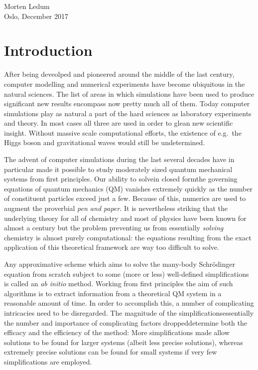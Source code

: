 \documentclass[twoside,english]{uiofysmaster}
\begin{document}
\begin{acknowledgements}
  \begin{flushright}
  Morten Ledum \\ Oslo, December 2017
  \end{flushright}

\end{acknowledgements}

\tableofcontents

\chapter{Introduction \label{chap1}}
After being deveolped and pioneered around the middle of the last century, computer modelling and numerical experiments have become ubiquitous in the natural sciences. The list of areas in which simulations have been used to produce significant new results encompass now pretty much all of them. Today computer simulations play as natural a part of the hard sciences as laboratory experiments and theory. In most cases all three are used in order to glean new scientific insight. Without massive scale computational efforts, the existence of e.g.\ the Higgs boson and gravitational waves would still be undetermined.

The advent of computer simulations during the last several decades have in particular made it possible to study moderately sized quantum mechanical systems from first principles. Our ability to solve\textemdash in closed form\textemdash the governing equations of quantum mechanics (QM) vanishes extremely quickly as the number of constituent particles exceed just a few. Because of this, numerics are used to augment the proverbial \emph{pen and paper}. It is nevertheless striking that the underlying theory for all of chemistry and most of physics have been known for almost a century but the problem preventing us from essentially \emph{solving} chemistry is almost purely computational: the equations resulting from the exact application of this theoretical framework are way too difficult to solve.

Any approximative scheme which aims to solve the many-body Schrödinger equation from scratch subject to some (more or less) well-defined simplifications is called an \emph{ab initio} method. Working from first principles the aim of such algorithms is to extract information from a theoretical QM system in a reasonable amount of time. In order to accomplish this, a number of complicating intricacies need to be disregarded. The magnitude of the simplifications\textemdash essentially the number and importance of complicating factors dropped\textemdash determine both the efficacy and the efficiency of the method: More simplifications made allow solutions to be found for larger systems (albeit less precise solutions), whereas extremely precise solutions can be found for small systems if very few simplifications are employed.
\end{document}
